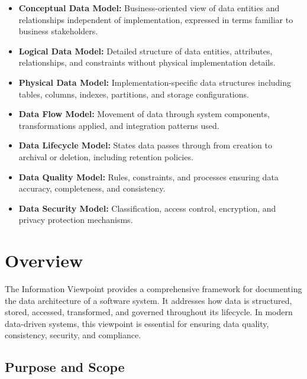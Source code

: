 \documentclass[11pt,letterpaper]{article}
\begin{document}
\begin{itemize}
    \item \textbf{Conceptual Data Model:} Business-oriented view of data entities and relationships independent of implementation, expressed in terms familiar to business stakeholders.
    
    \item \textbf{Logical Data Model:} Detailed structure of data entities, attributes, relationships, and constraints without physical implementation details.
    
    \item \textbf{Physical Data Model:} Implementation-specific data structures including tables, columns, indexes, partitions, and storage configurations.
    
    \item \textbf{Data Flow Model:} Movement of data through system components, transformations applied, and integration patterns used.
    
    \item \textbf{Data Lifecycle Model:} States data passes through from creation to archival or deletion, including retention policies.
    
    \item \textbf{Data Quality Model:} Rules, constraints, and processes ensuring data accuracy, completeness, and consistency.
    
    \item \textbf{Data Security Model:} Classification, access control, encryption, and privacy protection mechanisms.
\end{itemize}

\section{Overview}

The Information Viewpoint provides a comprehensive framework for documenting the data architecture of a software system. It addresses how data is structured, stored, accessed, transformed, and governed throughout its lifecycle. In modern data-driven systems, this viewpoint is essential for ensuring data quality, consistency, security, and compliance.

\subsection{Purpose and Scope}
\end{document}
